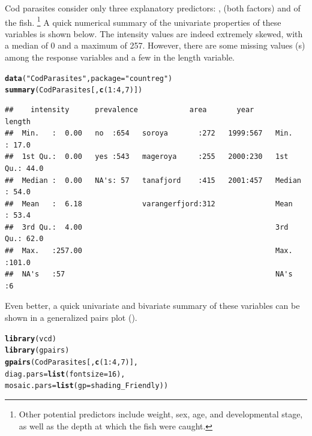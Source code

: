 \documentclass[11pt]{book}\usepackage[]{graphicx}\usepackage[]{color}
\makeatletter
\newcommand{\hlnum}[1]{\textcolor[rgb]{0.686,0.059,0.569}{#1}}%
\newcommand{\hlstr}[1]{\textcolor[rgb]{0.192,0.494,0.8}{#1}}%
\newcommand{\hlopt}[1]{\textcolor[rgb]{0,0,0}{#1}}%
\newcommand{\hlstd}[1]{\textcolor[rgb]{0.345,0.345,0.345}{#1}}%
\newcommand{\hlkwc}[1]{\textcolor[rgb]{0.333,0.667,0.333}{#1}}%
\newcommand{\hlkwd}[1]{\textcolor[rgb]{0.737,0.353,0.396}{\textbf{#1}}}%
\newenvironment{kframe}{%
 \def\at@end@of@kframe{}%
 \ifinner\ifhmode%
  \def\at@end@of@kframe{\end{minipage}}%
  \begin{minipage}{\columnwidth}%
 \fi\fi%
 \def\FrameCommand##1{\hskip\@totalleftmargin \hskip-\fboxsep
 \colorbox{shadecolor}{##1}\hskip-\fboxsep
     \hskip-\linewidth \hskip-\@totalleftmargin \hskip\columnwidth}%
 \MakeFramed {\advance\hsize-\width
   \@totalleftmargin\z@ \linewidth\hsize
   \@setminipage}}%
 {\par\unskip\endMakeFramed%
 \at@end@of@kframe}
\newenvironment{knitrout}{}{} %
\renewenvironment{knitrout}{\small\renewcommand{\baselinestretch}{.85}}{} %
\makeatother
\begin{document}
\begin{Example}[cod1]{Cod parasites}
\citet{Hemmingsen-etal:2005} consider only three explanatory predictors: , 
(both factors) and  of the fish.%
\footnote{
Other potential predictors include weight, sex, age, and developmental stage, as well as the
depth at which the fish were caught.
}
A quick numerical summary of the univariate properties of these variables is shown below.
The intensity values are indeed extremely skewed, with a median of 0 and a maximum of 257.
However, there are some missing values (s) among the response variables and
a few in the length variable.
\begin{knitrout}\footnotesize
{}\color{fgcolor}\begin{kframe}
\begin{alltt}
\hlkwd{data}\hlstd{(}\hlstr{"CodParasites"}\hlstd{,} \hlkwc{package} \hlstd{=} \hlstr{"countreg"}\hlstd{)}
\hlkwd{summary}\hlstd{(CodParasites[,} \hlkwd{c}\hlstd{(}\hlnum{1}\hlopt{:}\hlnum{4}\hlstd{,}\hlnum{7}\hlstd{)])}
\end{alltt}
\begin{verbatim}
##    intensity      prevalence            area       year         length     
##  Min.   :  0.00   no  :654   soroya       :272   1999:567   Min.   : 17.0  
##  1st Qu.:  0.00   yes :543   mageroya     :255   2000:230   1st Qu.: 44.0  
##  Median :  0.00   NA's: 57   tanafjord    :415   2001:457   Median : 54.0  
##  Mean   :  6.18              varangerfjord:312              Mean   : 53.4  
##  3rd Qu.:  4.00                                             3rd Qu.: 62.0  
##  Max.   :257.00                                             Max.   :101.0  
##  NA's   :57                                                 NA's   :6
\end{verbatim}
\end{kframe}
\end{knitrout}

Even better, a quick univariate and bivariate summary of these variables can be shown in a generalized pairs plot
().
\begin{knitrout}
\color{fgcolor}\begin{kframe}
\begin{alltt}
\hlkwd{library}\hlstd{(vcd)}
\hlkwd{library}\hlstd{(gpairs)}
\hlkwd{gpairs}\hlstd{(CodParasites[,} \hlkwd{c}\hlstd{(}\hlnum{1}\hlopt{:}\hlnum{4}\hlstd{,}\hlnum{7}\hlstd{)],}
       \hlkwc{diag.pars}\hlstd{=}\hlkwd{list}\hlstd{(}\hlkwc{fontsize}\hlstd{=}\hlnum{16}\hlstd{),}
       \hlkwc{mosaic.pars}\hlstd{=}\hlkwd{list}\hlstd{(}\hlkwc{gp}\hlstd{=shading_Friendly))}
\end{alltt}
\end{kframe}\begin{figure}[htb!]


\end{figure}
\end{knitrout}
\end{Example}
\end{document}
